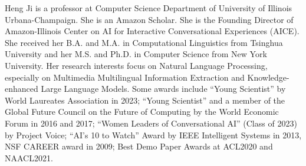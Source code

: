 Heng Ji is a professor at Computer Science Department of University of Illinois Urbana-Champaign. She is an Amazon Scholar. She is the Founding Director of Amazon-Illinois Center on AI for Interactive Conversational Experiences (AICE). She received her B.A. and M.A. in Computational Linguistics from Tsinghua University and her M.S. and Ph.D. in Computer Science from New York University. Her research interests focus on Natural Language Processing, especially on Multimedia Multilingual Information Extraction and Knowledge-enhanced Large Language Models. Some awards include “Young Scientist” by World Laureates Association in 2023; “Young Scientist” and a member of the Global Future Council on the Future of Computing by the World Economic Forum in 2016 and 2017; “Women Leaders of Conversational AI” (Class of 2023) by Project Voice; “AI’s 10 to Watch” Award by IEEE Intelligent Systems in 2013, NSF CAREER award in 2009; Best Demo Paper Awards at ACL2020 and NAACL2021.
